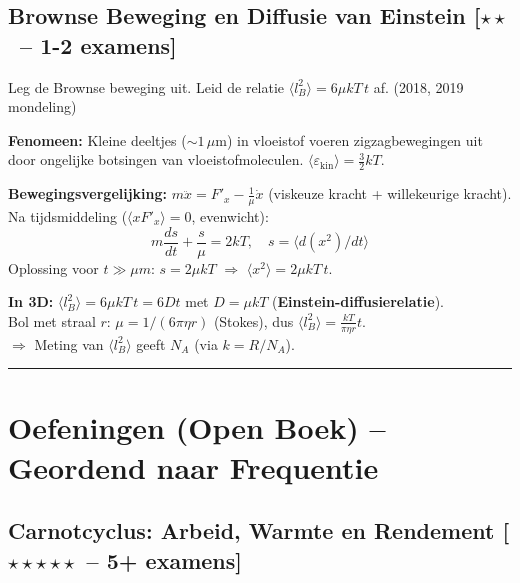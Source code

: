 \documentclass[10pt,a4paper]{article}
\begin{document}
\subsection{Brownse Beweging en Diffusie van Einstein \textnormal{\color{warningred}[$\star\star$\ -- 1-2 examens]}}

\begin{theorievraag}{Leg de Brownse beweging uit. Leid de relatie $\langle l_B^2\rangle = 6\mu kT\,t$ af. \textnormal{(2018, 2019 mondeling)}}
\end{theorievraag}

\begin{oplossing}
\textbf{Fenomeen:} Kleine deeltjes ($\sim 1\,\mu$m) in vloeistof voeren zigzagbewegingen uit door ongelijke botsingen van vloeistofmoleculen. $\langle\varepsilon_\text{kin}\rangle = \frac{3}{2}kT$.

\textbf{Bewegingsvergelijking:} $m\ddot{x} = F'_x - \frac{1}{\mu}\dot{x}$ (viskeuze kracht + willekeurige kracht).\\
Na tijdsmiddeling ($\langle xF'_x\rangle = 0$, evenwicht):
$$m\frac{ds}{dt} + \frac{s}{\mu} = 2kT, \quad s = \langle d(x^2)/dt\rangle$$
Oplossing voor $t \gg \mu m$: $s = 2\mu kT$ $\Rightarrow$ $\langle x^2\rangle = 2\mu kT\,t$.

\textbf{In 3D:} $\langle l_B^2\rangle = 6\mu kT\,t = 6Dt$ met $D = \mu kT$ (\textbf{Einstein-diffusierelatie}).\\
Bol met straal $r$: $\mu = 1/(6\pi\eta r)$ (Stokes), dus $\langle l_B^2\rangle = \frac{kT}{\pi\eta r}t$.\\
$\Rightarrow$ Meting van $\langle l_B^2\rangle$ geeft $N_A$ (via $k = R/N_A$).
\end{oplossing}

\noindent\textcolor{headerbg}{\rule{\linewidth}{1pt}}

\section{Oefeningen (Open Boek) -- Geordend naar Frequentie}

\subsection{Carnotcyclus: Arbeid, Warmte en Rendement \textnormal{\color{warningred}[$\star\star\star\star\star$\ -- 5+ examens]}}
\end{document}
